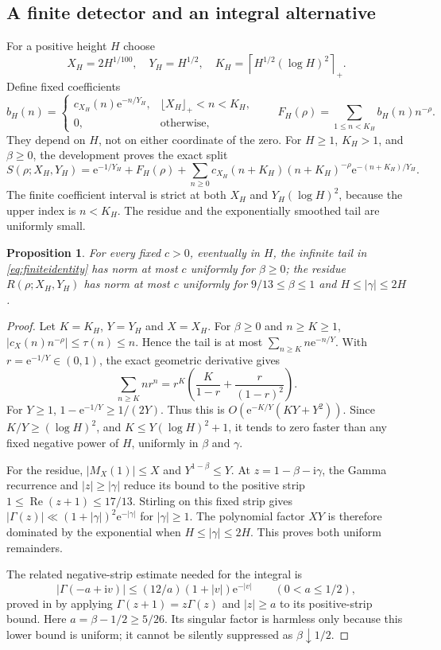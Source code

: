 \documentclass[11pt,a4paper,oneside]{article}
\newtheorem{proposition}[theorem]{Proposition}
\theoremstyle{definition}
\newcommand{\ii}{\mathrm i}
\newcommand{\e}{\mathrm e}
\newcommand{\Rea}{\operatorname{Re}}
\numberwithin{equation}{section}
\begin{document}
\subsection{A finite detector and an integral alternative}
For a positive height $H$ choose
\[
 X_H=2H^{1/100},\quad Y_H=H^{1/2},\quad
 K_H=\left\lceil H^{1/2}(\log H)^2\right\rceil_+.
\]
Define fixed coefficients
\[
 b_H(n)=\begin{cases}c_{X_H}(n)\e^{-n/Y_H},&
              \lfloor X_H\rfloor_+<n<K_H,\\0,&\text{otherwise},\end{cases}
 \qquad F_H(\rho)=\sum_{1\le n<K_H}b_H(n)n^{-\rho}.
\]
They depend on $H$, not on either coordinate of the zero.
For $H\ge1$, $K_H>1$, and $\beta\ge0$, the development proves the exact split
\begin{equation}\label{eq:finiteidentity}
 S(\rho;X_H,Y_H)=\e^{-1/Y_H}+F_H(\rho)
          +\sum_{n\ge0}c_{X_H}(n+K_H)(n+K_H)^{-\rho}\e^{-(n+K_H)/Y_H}.
\end{equation}
The finite coefficient interval is strict at both $X_H$ and
$Y_H(\log H)^2$, because the upper index is $n<K_H$.
The residue and the exponentially smoothed tail are uniformly small.
\begin{proposition}\label{input:remdet}
For every fixed $c>0$, eventually in $H$, the infinite tail in
\eqref{eq:finiteidentity} has norm at most $c$ uniformly for $\beta\ge0$;
the residue $R(\rho;X_H,Y_H)$ has norm at most $c$ uniformly for
$9/13\le\beta\le1$ and $H\le|\gamma|\le2H$.
\end{proposition}
\begin{proof}
Let $K=K_H$, $Y=Y_H$ and $X=X_H$. For $\beta\ge0$ and $n\ge K\ge1$, $|c_X(n)n^{-\rho}|\le\tau(n)\le n$. Hence the tail is at most $\sum_{n\ge K}n\e^{-n/Y}$. With $r=\e^{-1/Y}\in(0,1)$, the exact geometric derivative gives
\[
 \sum_{n\ge K}nr^n=r^K\left(\frac K{1-r}+\frac r{(1-r)^2}\right).
\]
For $Y\ge1$, $1-\e^{-1/Y}\ge1/(2Y)$. Thus this is $O(\e^{-K/Y}(KY+Y^2))$. Since $K/Y\ge(\log H)^2$, and $K\le Y(\log H)^2+1$, it tends to zero faster than any fixed negative power of $H$, uniformly in $\beta$ and $\gamma$.

For the residue, $|M_X(1)|\le X$ and $Y^{1-\beta}\le Y$. At $z=1-\beta-\ii\gamma$, the Gamma recurrence and $|z|\ge|\gamma|$ reduce its bound to the positive strip $1\le\Rea(z+1)\le17/13$. Stirling on this fixed strip gives $|\Gamma(z)|\ll (1+|\gamma|)^2\e^{-|\gamma|}$ for $|\gamma|\ge1$. The polynomial factor $XY$ is therefore dominated by the exponential when $H\le|\gamma|\le2H$. This proves both uniform remainders.

The related negative-strip estimate needed for the integral is
\[
 |\Gamma(-a+\ii v)|\le(12/a)(1+|v|)\e^{-|v|}
 \qquad(0<a\le1/2),
\]
proved in \cite{Lewko} by applying $\Gamma(z+1)=z\Gamma(z)$ and $|z|\ge a$ to its positive-strip bound. Here $a=\beta-1/2\ge5/26$. Its singular factor is harmless only because this lower bound is uniform; it cannot be silently suppressed as $\beta\downarrow1/2$.
\end{proof}
\end{document}
